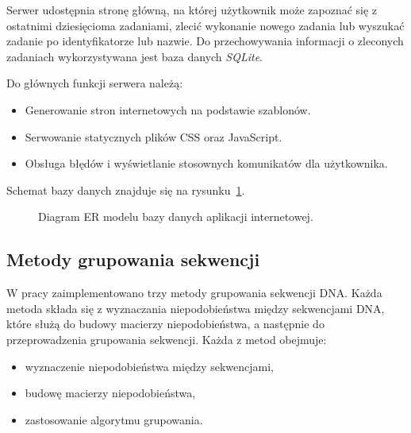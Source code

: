            Serwer udostępnia stronę główną, na której użytkownik może zapoznać się z ostatnimi dziesięcioma zadaniami, zlecić wykonanie nowego zadania lub wyszukać zadanie po identyfikatorze lub nazwie. Do przechowywania informacji o zleconych zadaniach wykorzystywana jest baza danych \textit{SQLite}.
            
            Do głównych funkcji serwera należą:
            \begin{itemize}
                \item Generowanie stron internetowych na podstawie szablonów.
                \item Serwowanie statycznych plików CSS oraz JavaScript.
                \item Obsługa błędów i wyświetlanie stosownych komunikatów dla użytkownika.
            \end{itemize}
            
            Schemat bazy danych znajduje się na rysunku~\ref{Picture:App:Database}.

            \begin{figure}
                \begin{center}
                    
                \end{center}
                \caption{
                    Diagram ER modelu bazy danych aplikacji internetowej.
                }\label{Picture:App:Database}
            \end{figure}

    \subsection{Metody grupowania sekwencji}

        W pracy zaimplementowano trzy metody grupowania sekwencji DNA. Każda metoda składa się z wyznaczania niepodobieństwa między sekwencjami DNA, które służą do budowy macierzy niepodobieństwa, a następnie do przeprowadzenia grupowania sekwencji. Każda z metod obejmuje:

        \begin{itemize}
            \item {wyznaczenie niepodobieństwa między sekwencjami,}
            \item {budowę macierzy niepodobieństwa,}
            \item {zastosowanie algorytmu grupowania.}
        \end{itemize}

